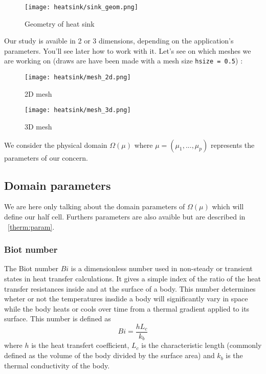 \begin{figure}[!h]
\centering
\texttt{[image: heatsink/sink\_geom.png]}
\caption{Geometry of heat sink}
\end{figure}

Our study is avaible in 2 or 3 dimensions, depending on the application's parameters. You'll see later how to work with it. Let's see on which meshes we are working on (draws are have been made with a mesh size \lstinline!hsize = 0.5!)  :
\begin{figure}[!h]
\begin{minipage}[b]{.50\linewidth}
\centering
\texttt{[image: heatsink/mesh\_2d.png]}
\caption{2D mesh}
\end{minipage}
\begin{minipage}[b]{.50\linewidth}
\centering
\texttt{[image: heatsink/mesh\_3d.png]}
\caption{3D mesh}
\end{minipage}
\end{figure}

We consider the physical domain $\varOmega (\mu)$ where $\mu = (\mu_1, ...,\mu_p)$ represents the parameters of our concern. 

\subsection{Domain parameters}
We are here only talking about the domain parameters of $\varOmega(\mu)$ which will define our half cell. Furthers parameters are also avaible but are described in ~\ref{therm:param}.


\subsubsection{Biot number}
The Biot number $Bi$ is a dimensionless number used in non-steady or transient states in heat transfer calculations. It gives a simple index of the ratio of the heat transfer resistances inside  and at the surface of a body. This number determines wheter or not the temperatures insdide a body will significantly vary in space while the body heats or cools over time from a thermal gradient applied to its surface. This number is defined as 
\begin{equation}
Bi = \frac{hL_c}{k_b}
\end{equation} 
where $h$ is the heat transfert coefficient, $L_c$ is the characteristic length (commonly defined as the volume of the body divided by the surface area) and $k_b$ is the thermal conductivity of the body. 

